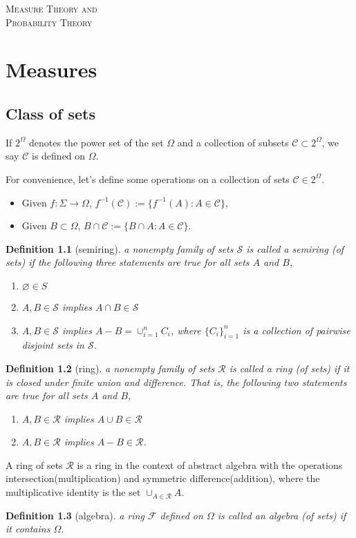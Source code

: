 \documentclass{report}
\newtheorem{definition}{Definition}[section]
\theoremstyle{nonumberplain}
\begin{document}
\begin{center}
	\textsc{\Huge Measure Theory and}
	~\\
	\vspace{1em}  
	\textsc{\Huge Probability Theory}	
\end{center}
\vspace{1em} 
\tableofcontents
\chapter{Measures}
\section{Class of sets}
If $2^\Omega$ denotes the power set of the set $\Omega$ and a collection of subsets $\mathcal{C}\subset2^\Omega$, we say $\mathcal{C}$ is defined on $\Omega$.

For convenience, let's define some operations on a collection of sets $\mathcal{C}\in 2^{\Omega}$.
\begin{itemize}
	\item Given $f:\Sigma\to\Omega$, $f^{-1}(\mathcal{C}):=\{f^{-1}(A):A\in\mathcal{C}\}$,
	\item Given $B\subset \Omega$, $B\cap \mathcal{C}:=\{B\cap A:A\in\mathcal{C}\}$.
\end{itemize}
\begin{definition}[semiring]
	a nonempty family of sets $\mathcal{S}$ is called a \emph{semiring (of sets)} if the following three statements are true for all sets $A$ and $B$,
	\begin{enumerate}
		\item $\varnothing\in S$
		\item $A,B\in \mathcal{S}$ implies $A\cap B\in\mathcal{S}$ 
		\item $A,B\in \mathcal{S}$ implies $A-B=\cup_{i=1}^n C_i$, where $\{C_{i}\}_{i=1}^{n}$ is a collection of pairwise disjoint sets in $\mathcal{S}$.
	\end{enumerate}	
\end{definition}
\begin{definition}[ring]
	a nonempty family of sets $\mathcal{R}$ is called a \emph{ring (of sets)} if it is closed under finite union and difference. That is, the following two statements are true for all sets $A$ and $B$,
	\begin{enumerate}
	\item $A,B\in \mathcal{R}$ implies $A\cup B\in\mathcal{R}$ 
	\item $A,B\in \mathcal{R}$ implies $A-B\in\mathcal{R}$.
	\end{enumerate}	
\end{definition}
A ring of sets $\mathcal{R}$ is a ring in the context of abstract algebra with the operations intersection(multiplication) and symmetric difference(addition), where the multiplicative identity is the set $\cup_{A\in \mathcal{R}} A$. 
\begin{definition}[algebra]
	a ring $\mathcal{F}$ defined on $\Omega$ is called an \emph{algebra (of sets)} if it contains $\Omega$. 
\end{definition}
\end{document}
